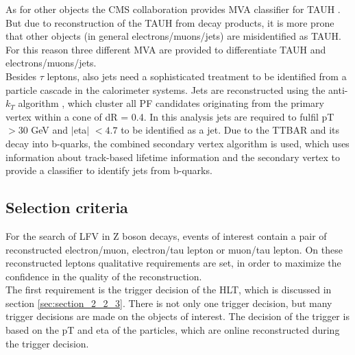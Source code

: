 As for other objects the \gls{CMS} collaboration provides \gls{MVA} classifier for \gls{TAUH} \cite{TAURECO}. But due to reconstruction of the \gls{TAUH} from decay products, it is more prone that other objects (in general electrons/muons/jets) are misidentified as \gls{TAUH}. For this reason three different \gls{MVA} are provided to differentiate \gls{TAUH} and electrons/muons/jets. \\

Besides $\tau$ leptons, also jets need a sophisticated treatment to be identified from a particle cascade in the calorimeter systems. Jets are reconstructed using the anti-$k_T$ algorithm \cite{ANTIKT}, which cluster all \gls{PF} candidates originating from the primary vertex within a cone of \gls{dR} = 0.4. In this analysis jets are required to fulfil \gls{pT} $> 30$ GeV and $|$\gls{eta}$|$ $ < 4.7$ to be identified as a jet. Due to the \gls{TTBAR} and its decay into b-quarks, the combined secondary vertex algorithm \cite{CSV} is used, which uses information about track-based lifetime information and the secondary vertex to provide a classifier to identify jets from b-quarks. 


\subsection{Selection criteria}
\label{sec:section_3_2_2}

For the search of \gls{LFV} in Z boson decays, events of interest contain a pair of reconstructed electron/muon, electron/tau lepton or muon/tau lepton. On these reconstructed leptons qualitative requirements are set, in order to maximize the confidence in the quality of the reconstruction. \\

The first requirement is the trigger decision of the \gls{HLT}, which is discussed in section \ref{sec:section_2_2_3}. There is not only one trigger decision, but many trigger decisions are made on the objects of interest. The decision of the trigger is based on the \gls{pT} and \gls{eta} of the particles, which are online reconstructed during the trigger decision. 

